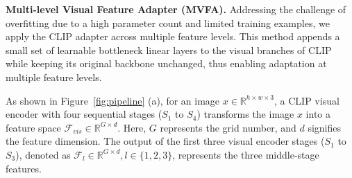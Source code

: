 \noindent\textbf{Multi-level Visual Feature Adapter (MVFA).}
Addressing the challenge of overfitting due to a high parameter count and limited training examples, we apply the CLIP adapter across multiple feature levels. This method appends a small set of learnable bottleneck linear layers to the visual branches of CLIP while keeping its original backbone unchanged, thus enabling adaptation at multiple feature levels. 
 
As shown in Figure~\ref{fig:pipeline} (a), for an image $x \in \mathbb{R}^{h\times w\times 3}$, a CLIP visual encoder with four sequential stages ($S_1$ to $S_4$) transforms the image $x$ into a feature space $\mathcal{F}_{vis} \in \mathbb{R}^{G\times d}$. Here, $G$ represents the grid number, and $d$ signifies the feature dimension. The output of the first three visual encoder stages ($S_1$ to $S_3$), denoted as $\mathcal{F}_l \in \mathbb{R}^{G\times d}, l\in\{1,2,3\}$, represents the three middle-stage features.

